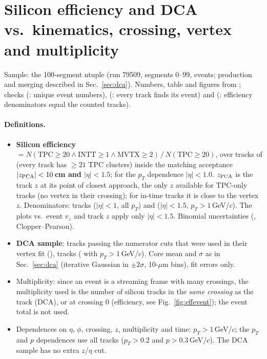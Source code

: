 \section{Silicon efficiency and DCA vs.\ kinematics, crossing, vertex and multiplicity}
\label{sec:effdca}

Sample: the 100-segment ntuple (run 79509, segments 0--99, \eNEvents{} events; production and merging described in Sec.~\ref{sec:dca}).
Numbers, table and figures from ; checks  (\chkEDup: unique event
numbers),  (\chkENoEv: every track finds its event) and  (\chkECount:
efficiency denominators equal the counted tracks).

\paragraph{Definitions.}
\begin{itemize}\itemsep0pt
\item \textbf{Silicon efficiency} $=N(\text{TPC}\geq20 \wedge \text{INTT}\geq1 \wedge \text{MVTX}\geq2)\,/\,N(\text{TPC}\geq20)$,
  over tracks of  (every track has $\geq21$ TPC clusters) inside the matching acceptance
  \textbf{$|z_{\rm PCA}|<10$\,cm and $|\eta|<1.5$}; for the $p_T$ dependence \textbf{$|\eta|<1.0$}. $z_{\rm PCA}$ is the
  track $z$ at its point of closest approach, the only $z$ available for TPC-only tracks (no vertex in their
  crossing); for in-time tracks it is close to the vertex $z$. Denominators: \eNDen{} tracks ($|\eta|<1$, all
  $p_T$) and \eNDenHi{} ($|\eta|<1.5$, $p_T>1$\,GeV/$c$). The plots vs.\ event $v_z$ and track $z$ apply only
  $|\eta|<1.5$. Binomial uncertainties (, Clopper--Pearson).
\item \textbf{DCA sample}: tracks passing the numerator cuts that were used in their vertex fit
  (), \eNDca{} tracks (\eNDcaHi{} with $p_T>1$\,GeV/$c$). Core mean and $\sigma$ as in
  Sec.~\ref{sec:dca} (iterative Gaussian in $\pm2\sigma$, 10-$\mu$m bins), fit errors only.
\item Multiplicity: since an event is a streaming frame with many crossings, the multiplicity used is the
  number of silicon tracks in the \emph{same crossing} as the track (DCA), or at crossing 0 (efficiency, see
  Fig.~\ref{fig:effevent}); the event total is not used.
\item Dependences on $\eta$, $\phi$, crossing, $z$, multiplicity and time: $p_T>1$\,GeV/$c$; the $p_T$ and $p$
  dependences use all tracks ($p_T>0.2$ and $p>0.3$\,GeV/$c$). The DCA sample has no extra $z$/$\eta$ cut.
\end{itemize}


